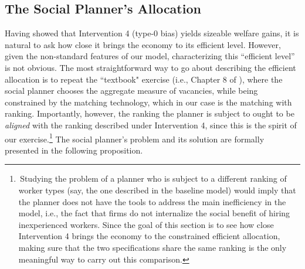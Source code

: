 \documentclass[12pt]{article} %
\theoremstyle{definition}
\begin{document}
\subsection{The Social Planner's Allocation} \label{section planner}

Having showed that Intervention 4 (type-0 bias) yields sizeable welfare gains, it is natural to ask how close it brings the economy to its efficient level.
However, given the non-standard features of our model, characterizing this ``efficient level'' is not obvious.
The most straightforward way to go about describing the efficient allocation is to repeat the ``textbook" exercise (i.e., Chapter 8 of \citealt{pissarides2000equilibrium}), where the social planner chooses the aggregate measure of vacancies, while being constrained by the matching technology, which in our case is the \cite{petrongolo2001looking} matching with ranking. Importantly, however, the ranking the planner is subject to ought to be \textit{aligned} with the ranking described under Intervention 4, since this is the spirit of our exercise.\footnote{\,Studying the problem of a planner who is subject to a different ranking of worker types (say, the one described in the baseline model) would imply that the planner does not have the tools to address the main inefficiency in the model, i.e., the fact that firms do not internalize the social benefit of hiring inexperienced workers. Since the goal of this section is to see how close Intervention 4 brings the economy to the constrained efficient allocation, making sure that the two specifications share the same ranking is the only meaningful way to carry out this comparison.} The social planner's problem and its solution are formally presented in the following proposition. 
\end{document}
